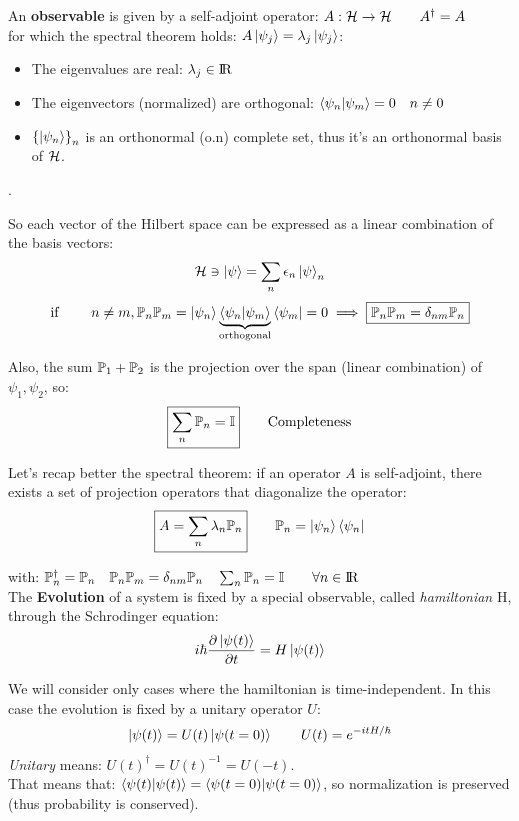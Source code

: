 An \textbf{observable} is given by a self-adjoint operator: $A: \mathcal{H}\to \mathcal{H} \qquad A^\dag = A$\\
for which the spectral theorem holds: $A\left|\psi_j\right\rangle = \lambda_j \left|\psi_j\right\rangle$:
\begin{itemize}
    \item The eigenvalues are real: $\lambda_j \in {\rm I\!R}$
    \item The eigenvectors (normalized) are orthogonal: $\left\langle \psi_n \middle| \psi_m \right\rangle = 0 \quad n\ne0$
    \item $\left\{\left|\psi_n\right\rangle\right\}_n$ is an orthonormal (o.n) complete set, thus it's an orthonormal basis of $\mathcal{H}$.
\end{itemize}
.

So each vector of the Hilbert space can be expressed as a linear combination of the basis vectors:
$$\mathcal{H} \ni \left|\psi\right\rangle = \sum_n \epsilon_n \left|\psi\right\rangle_n$$
$$\text{if } \qquad n\ne m, \mathbb{P}_n\mathbb{P}_m = \left|\psi_n\right\rangle\underbrace{\left\langle \psi_n \middle| \psi_m \right\rangle}_{\text{orthogonal}}\left\langle\psi_m\right| = 0 \implies \boxed{\mathbb{P}_n\mathbb{P}_m = \delta_{nm}\mathbb{P}_n}$$

Also, the sum $\mathbb{P}_1 + \mathbb{P}_2$ is the projection over the span (linear combination) of $\psi_1,\psi_2$, so: 
$$\boxed{\sum_n\mathbb{P}_n = \mathbb{I}} \qquad \text{Completeness}$$

Let's recap better the spectral theorem: if an operator $A$ is self-adjoint, there exists a set of projection operators that diagonalize the operator:
\begin{equation}\label{eq:spectral}
    \boxed{A = \sum_n \lambda_n\mathbb{P}_n} \qquad \mathbb{P}_n = \left|\psi_n\right\rangle\left\langle\psi_n\right|
\end{equation}

with: $\mathbb{P}_n^\dag = \mathbb{P}_n \quad \mathbb{P}_n\mathbb{P}_m = \delta_{nm}\mathbb{P}_n \quad \sum_n \mathbb{P}_n = \mathbb{I} \qquad \forall n \in {\rm I\!R}$\\

The \textbf{Evolution} of a system is fixed by a special observable, called \textit{hamiltonian} H, through the Schrodinger equation:
$$ i\hbar \frac{\partial\left|\psi(t)\right\rangle}{\partial t} = H \left|\psi(t)\right\rangle$$

We will consider only cases where the hamiltonian is time-independent. In this case the evolution is fixed by a unitary operator $U$:
$$ \left|\psi(t)\right\rangle = U(t) \left|\psi(t=0)\right\rangle \qquad U(t) = e^{-itH/\hbar}$$
\textit{Unitary} means: $U(t)^\dag = U(t)^{-1} = U(-t)$. \\
That means that: $\left\langle \psi(t) \middle| \psi(t) \right\rangle = \left\langle \psi(t=0) \middle| \psi(t=0) \right\rangle$, so normalization is preserved (thus probability is conserved).\\

